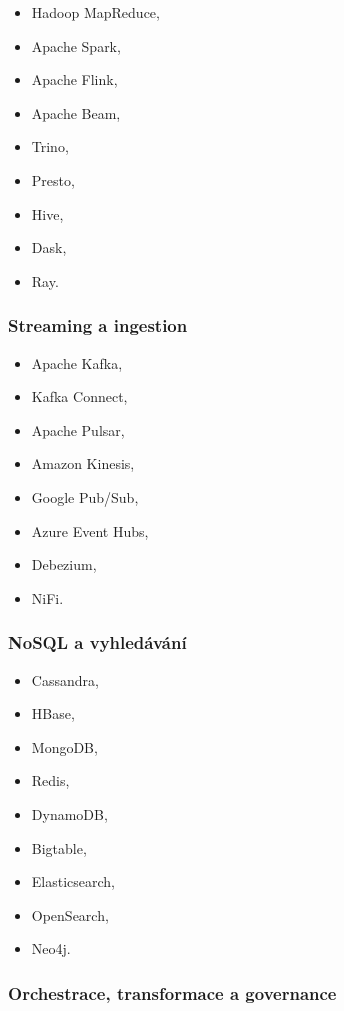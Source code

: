 \begin{itemize}
    \item Hadoop MapReduce,
    \item Apache Spark,
    \item Apache Flink,
    \item Apache Beam,
    \item Trino,
    \item Presto,
    \item Hive,
    \item Dask,
    \item Ray.
\end{itemize}

\subsubsection{Streaming a ingestion}

\begin{itemize}
    \item Apache Kafka,
    \item Kafka Connect,
    \item Apache Pulsar,
    \item Amazon Kinesis,
    \item Google Pub/Sub,
    \item Azure Event Hubs,
    \item Debezium,
    \item NiFi.
\end{itemize}

\subsubsection{NoSQL a vyhledávání}

\begin{itemize}
    \item Cassandra,
    \item HBase,
    \item MongoDB,
    \item Redis,
    \item DynamoDB,
    \item Bigtable,
    \item Elasticsearch,
    \item OpenSearch,
    \item Neo4j.
\end{itemize}

\subsubsection{Orchestrace, transformace a governance}

